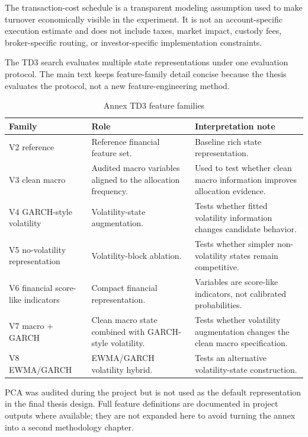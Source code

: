 \documentclass[12pt]{article}
\begin{document}
The transaction-cost schedule is a transparent modeling assumption used to make turnover economically visible in the experiment. It is not an account-specific execution estimate and does not include taxes, market impact, custody fees, broker-specific routing, or investor-specific implementation constraints.


The TD3 search evaluates multiple state representations under one evaluation protocol. The main text keeps feature-family detail concise because the thesis evaluates the protocol, not a new feature-engineering method.

\begin{table}[H]
\centering
\caption{Annex TD3 feature families}
\scriptsize
\begin{tabularx}{\textwidth}{L{0.18\textwidth}Y Y}
\toprule
\textbf{Family} & \textbf{Role} & \textbf{Interpretation note} \\
\midrule
V2 reference & Reference financial feature set. & Baseline rich state representation. \\
V3 clean macro & Audited macro variables aligned to the allocation frequency. & Used to test whether clean macro information improves allocation evidence. \\
V4 GARCH-style volatility & Volatility-state augmentation. & Tests whether fitted volatility information changes candidate behavior. \\
V5 no-volatility representation & Volatility-block ablation. & Tests whether simpler non-volatility states remain competitive. \\
V6 financial score-like indicators & Compact financial representation. & Variables are score-like indicators, not calibrated probabilities. \\
V7 macro + GARCH & Clean macro state combined with GARCH-style volatility. & Tests whether volatility augmentation changes the clean macro specification. \\
V8 EWMA/GARCH & EWMA/GARCH volatility hybrid. & Tests an alternative volatility-state construction. \\
\bottomrule
\end{tabularx}
\end{table}

PCA was audited during the project but is not used as the default representation in the final thesis design. Full feature definitions are documented in project outputs where available; they are not expanded here to avoid turning the annex into a second methodology chapter.
\end{document}
